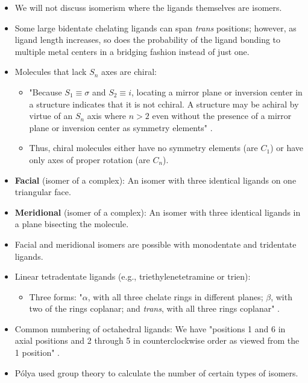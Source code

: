 \documentclass[../notes.tex]{subfiles}
\begin{document}
\begin{itemize}
\begin{table}[H]
        \label{fig:latinGreekAnions}
    \end{table}
    \item We will not discuss isomerism where the ligands themselves are isomers.
    \item Some large bidentate chelating ligands can span \emph{trans} positions; however, as ligand length increases, so does the probability of the ligand bonding to multiple metal centers in a bridging fashion instead of just one.
    \item Molecules that lack $S_n$ axes are chiral:
    \begin{itemize}
        \item "Because $S_1\equiv\sigma$ and $S_2\equiv i$, locating a mirror plane or inversion center in a structure indicates that it is not cchiral. A structure may be achiral by virtue of an $S_n$ axis where $n>2$ even without the presence of a mirror plane or inversion center as symmetry elements" \parencite[323]{bib:MiesslerFischerTarr}.
        \item Thus, chiral molecules either have no symmetry elements (are $C_1$) or have only axes of proper rotation (are $C_n$).
    \end{itemize}
    \item \textbf{Facial} (isomer of a  complex): An isomer with three identical ligands on one triangular face.
    \item \textbf{Meridional} (isomer of a  complex): An isomer with three identical ligands in a plane bisecting the molecule.
    \item Facial and meridional isomers are possible with monodentate and tridentate ligands.
    \item Linear tetradentate ligands (e.g., triethylenetetramine or trien):
    \begin{itemize}
        \item Three forms: "$\alpha$, with all three chelate rings in different planes; $\beta$, with two of the rings coplanar; and \emph{trans}, with all three rings coplanar" \parencite[323-24]{bib:MiesslerFischerTarr}.
    \end{itemize}
    \item Common numbering of octahedral ligands: We have "positions 1 and 6 in axial positions and 2 through 5 in counterclockwise order as viewed from the 1 position" \parencite[325]{bib:MiesslerFischerTarr}.
    \item P\'{o}lya used group theory to calculate the number of certain types of isomers.

\end{itemize}
\end{document}
